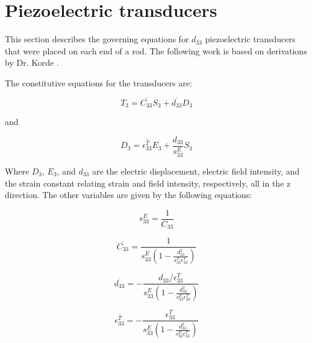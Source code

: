 \section{Piezoelectric transducers}

This section describes the governing equations for $d_{33}$ piezoelectric transducers that were placed on each end of a rod. The following work is based on derivations by Dr. Korde \cite{Fehrman2012}.

The constitutive equations for the transducers are:

\begin{equation}
T_3 = \overline{C_{33}} S_3 + \overline{d_{33}} D_3
\end{equation}

and 

\begin{equation}
D_3 = \overline{\epsilon ^T_{33}} E_3 + \frac{d_{33}}{s^E_{33}} S_3
\end{equation}


Where $D_3$, $E_3$, and $d_{33}$ are the electric displacement, electric field intensity, and the strain constant relating strain and field intensity, respectively, all in the z direction. The other variables are given by the following equations:

\begin{equation}
s^E_{33} = \frac{1}{C_{33}}
\end{equation}

\begin{equation}
\overline{C_{33}} = \frac{1}{s^E_{33}\left( 1 - \frac{d^2_{33}}{s^E_{33}\epsilon ^T_{33}}\right)}
\end{equation}

\begin{equation}
\overline{d_{33}} = -\frac{d_{33} / \epsilon ^T_{33}}{s^E_{33}\left(1 - \frac{d^2_{33}}{s^E_{33}\epsilon ^T_{33}}\right)}
\end{equation}

\begin{equation}
\overline{\epsilon ^T_{33}} = -\frac{\epsilon ^T_{33}}{s^E_{33}\left(1 - \frac{d^2_{33}}{s^E_{33}\epsilon ^T_{33}}\right)}
\end{equation}


